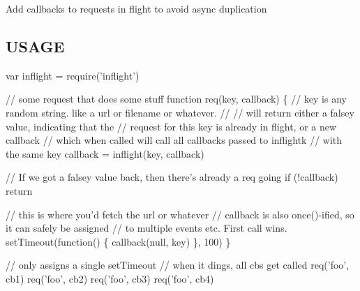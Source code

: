 Add callbacks to requests in flight to avoid async duplication

\subsection*{U\+S\+A\+GE}


\begin{DoxyCode}
var inflight = require('inflight')

// some request that does some stuff
function req(key, callback) \{
  // key is any random string.  like a url or filename or whatever.
  //
  // will return either a falsey value, indicating that the
  // request for this key is already in flight, or a new callback
  // which when called will call all callbacks passed to inflightk
  // with the same key
  callback = inflight(key, callback)

  // If we got a falsey value back, then there's already a req going
  if (!callback) return

  // this is where you'd fetch the url or whatever
  // callback is also once()-ified, so it can safely be assigned
  // to multiple events etc.  First call wins.
  setTimeout(function() \{
    callback(null, key)
  \}, 100)
\}

// only assigns a single setTimeout
// when it dings, all cbs get called
req('foo', cb1)
req('foo', cb2)
req('foo', cb3)
req('foo', cb4)
\end{DoxyCode}
 